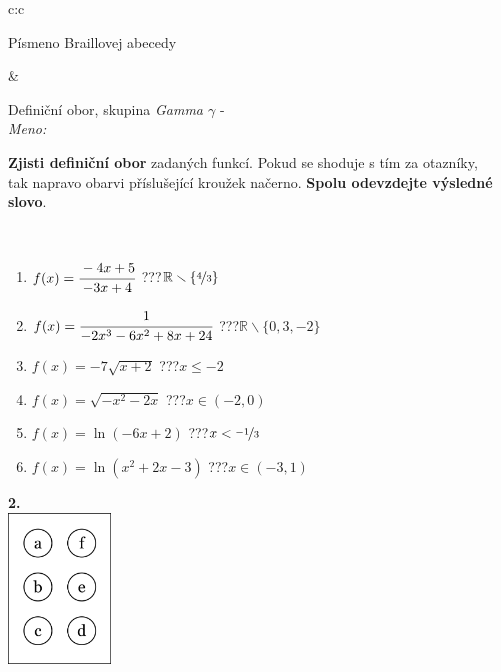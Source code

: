\documentclass[10pt]{report}
\begin{document}
\begin{tabular}{c:c}
\begin{minipage}[c][104.5mm][t]{0.5\linewidth}
\begin{center}
\begin{minipage}{0.20\linewidth}
\begin{center}
{\small Písmeno Braillovej abecedy}
\end{center}
\end{minipage}
\end{center}
\end{minipage}
&
\begin{minipage}[c][104.5mm][t]{0.5\linewidth}
\begin{center}
\vspace{7mm}
{\huge Definiční obor, skupina \textit{Gamma $\gamma$} -}\\[5mm]
\textit{Meno:}\phantom{xxxxxxxxxxxxxxxxxxxxxxxxxxxxxxxxxxxxxxxxxxxxxxxxxxxxxxxxxxxxxxxxx}\\[5mm]
\begin{minipage}{0.95\linewidth}
\textbf{Zjisti definiční obor} zadaných funkcí. Pokud se shoduje s tím za otazníky,\\tak napravo obarvi příslušející kroužek načerno. \textbf{Spolu odevzdejte výsledné slovo}.
\end{minipage}
\\[1mm]
\begin{minipage}{0.79\linewidth}
\begin{center}
\begin{varwidth}{\linewidth}
\begin{enumerate}
\normalsizerrr
\item $f(x)=\cfrac{-4x+5}{-3x+4}$\quad \dotfill\; ???\;\dotfill \quad $\mathbb{R}\smallsetminus\{\nicefrac{4}{3}\}$
\item $f(x)=\cfrac{1}{-2x^3-6x^2+8x+24}$\quad \dotfill\; ???\;\dotfill \quad $\mathbb{R}\smallsetminus\{0,3,-2\}$
\item $f(x)=-7\sqrt{x+2}$\quad \dotfill\; ???\;\dotfill \quad $x\leq-2$
\item $f(x)=\sqrt{-x^2-2x}$\quad \dotfill\; ???\;\dotfill \quad $x\in(-2 , 0)$
\item $f(x)=\ln{(-6x+2)}$\quad \dotfill\; ???\;\dotfill \quad $x<\nicefrac{-1}{3}$
\item $f(x)=\ln{(x^2+2x-3)}$\quad \dotfill\; ???\;\dotfill \quad $x\in(-3 , 1)$
\end{enumerate}
\end{varwidth}
\end{center}
\end{minipage}
\begin{minipage}{0.20\linewidth}
\begin{center}
{\Huge\bfseries 2.} \\[2mm]
\includegraphics[height=40mm]{../images/braille.png}

\end{center}
\end{minipage}
\end{center}
\end{minipage}
\end{tabular}
\end{document}
